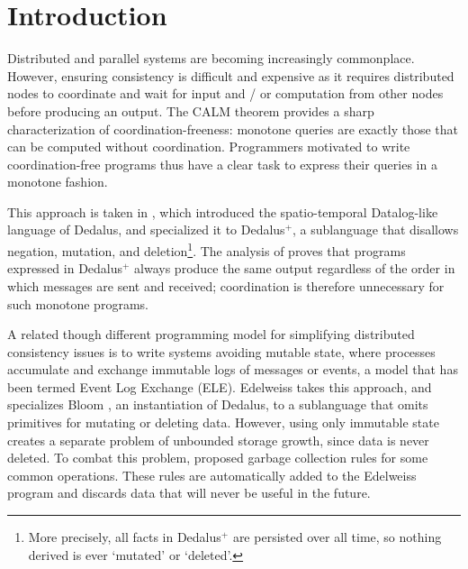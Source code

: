 
\section{Introduction}
\label{sec:intro}

Distributed and parallel systems are becoming increasingly commonplace.
However, ensuring consistency is difficult and expensive as it requires distributed nodes to coordinate and wait for input and / or computation from other nodes before producing an output.
The CALM theorem \cite{hellerstein2010declarative,ameloot2013relational} provides a sharp characterization of coordination-freeness: monotone queries are exactly those that can be computed without coordination.
Programmers motivated to write coordination-free programs thus have a clear task to express their queries in a monotone fashion.

This approach is taken in \cite{marczak2012confluence}, which introduced the spatio-temporal Datalog-like language of Dedalus, and specialized it to Dedalus$^+$, a sublanguage that disallows negation, mutation, and deletion\footnote{
	More precisely, all facts in Dedalus$^+$ are persisted over all time, so nothing derived is ever `mutated' or `deleted'.
}.
The analysis of \cite{marczak2012confluence} proves that programs expressed in Dedalus$^+$ always produce the same output regardless of the order in which messages are sent and received; coordination is therefore unnecessary for such monotone programs.

A related though different programming model for simplifying distributed consistency issues is to write systems avoiding mutable state, where processes accumulate and exchange immutable logs of messages or events, a model that has been termed Event Log Exchange (ELE).
Edelweiss \cite{conway2014edelweiss} takes this approach, and specializes Bloom \cite{alvaro2011consistency}, an instantiation of Dedalus, to a sublanguage that omits primitives for mutating or deleting data.
However, using only immutable state creates a separate problem of unbounded storage growth, since data is never deleted.
To combat this problem, \cite{conway2014edelweiss} proposed garbage collection rules for some common operations.
These rules are automatically added to the Edelweiss program and discards data that will never be useful in the future.

